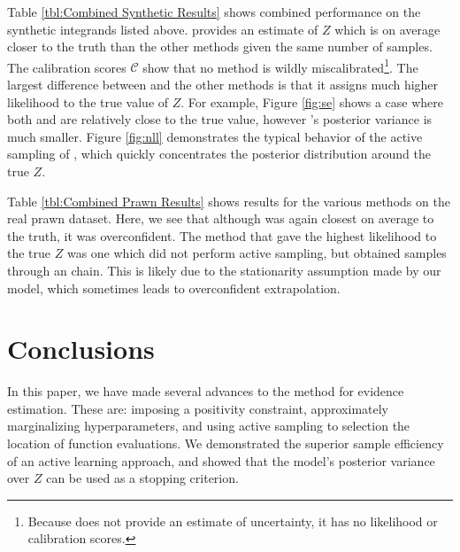 \documentclass{article}
\begin{document}
Table \ref{tbl:Combined Synthetic Results} shows combined performance on the synthetic integrands listed above.  provides an estimate of $Z$ which is on average closer to the truth than the other methods given the same number of samples. The calibration scores $\mathcal{C}$ show that no method is wildly miscalibrated\footnote{Because  does not provide an estimate of uncertainty, it has no likelihood or calibration scores.}.  The largest difference between  and the other methods is that it assigns much higher likelihood to the true value of $Z$.  For example, Figure \ref{fig:se} shows a case where both
  and  are relatively close to the true value, however 's posterior variance is much smaller.  Figure \ref{fig:nll} demonstrates the typical behavior of the active sampling of , which quickly concentrates the posterior distribution around the true $Z$.

Table \ref{tbl:Combined Prawn Results} shows results for the various methods on the real prawn dataset.  Here, we see that although  was again closest on average to the truth, it was overconfident.  The method that gave the highest likelihood to the true $Z$ was one which did not perform active sampling, but obtained samples through an  chain.  This is likely due to the stationarity assumption made by our \gpb model, which sometimes leads to overconfident extrapolation.

\section{Conclusions}

 In this paper, we have made several advances to the  method for evidence estimation.  These are: imposing a positivity constraint, approximately marginalizing hyperparameters, and using active sampling to selection the location of function evaluations.  We demonstrated the superior sample efficiency of an active learning approach, and showed that the model's posterior variance over $Z$ can be used as a stopping criterion.

\end{document}
